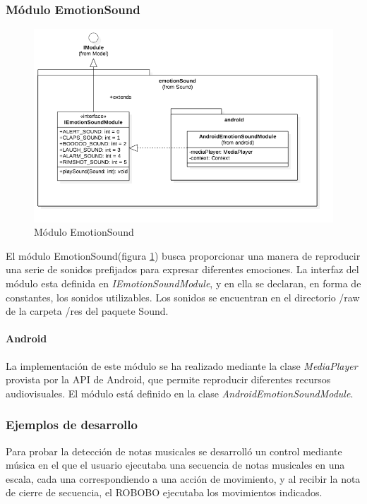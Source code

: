 \subsubsection{Módulo EmotionSound}
\begin{figure}
	\centering
	\includegraphics[width=1\linewidth]{imagenes/diagramas/EmotionSoundModule.png}
	\caption{Módulo EmotionSound}
	\label{fig:emotion-sound-module}
\end{figure}
El módulo EmotionSound(figura \ref{fig:emotion-sound-module}) busca proporcionar una manera de reproducir una serie de sonidos prefijados para expresar diferentes emociones.
La interfaz del módulo esta definida en \textit{IEmotionSoundModule}, y en ella se declaran, en forma de constantes, los sonidos utilizables.
Los sonidos se encuentran en el directorio /raw de la carpeta /res del paquete Sound.

\paragraph*{Android\\}

La implementación de este módulo se ha realizado mediante la clase \textit{MediaPlayer} provista por la API de Android, que permite reproducir diferentes recursos audiovisuales. El módulo está definido en la clase \textit{AndroidEmotionSoundModule}.


\subsubsection*{Ejemplos de desarrollo}

Para probar la detección de notas musicales se desarrolló un control mediante música en el que el usuario ejecutaba una secuencia de notas musicales en una escala, cada una correspondiendo a una acción de movimiento, y al recibir la nota de cierre de secuencia, el ROBOBO ejecutaba los movimientos indicados.



